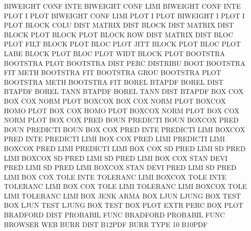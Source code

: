 BIWEIGHT CONF INTE                      BIWEIGHT CONF LIMI
BIWEIGHT CONF INTE PLOT                 I        PLOT
BIWEIGHT CONF LIMI PLOT                 I        PLOT
BIWEIGHT I    PLOT                      I        PLOT
BLOCK    COLU DIST                      MATRIX   DIST
BLOCK    DIST                           MATRIX   DIST
BLOCK    PLOT                           BLOCK    PLOT
BLOCK    ROW  DIST                      MATRIX   DIST
BLOC     PLOT FILT                      BLOCK    PLOT
BLOC     PLOT JITT                      BLOCK    PLOT
BLOC     PLOT LABE                      BLOCK    PLOT
BLOC     PLOT WIDT                      BLOCK    PLOT
BOOTSTRA                                BOOTSTRA PLOT
BOOTSTRA DIST PERC                      DISTRIBU BOOT
BOOTSTRA FIT  METH                      BOOTSTRA FIT
BOOTSTRA GROU                           BOOTSTRA PLOT
BOOTSTRA METH                           BOOTSTRA FIT
BOREL                                   BTAPDF
BOREL    DIST                           BTAPDF
BOREL    TANN                           BTAPDF
BOREL    TANN DIST                      BTAPDF
BOX      COX                            BOX      COX  NORM PLOT
BOXCOX                                  BOX      COX  NORM PLOT
BOXCOX   HOMO PLOT                      BOX      COX  HOMO PLOT
BOXCOX   NORM PLOT                      BOX      COX  NORM PLOT
BOX      COX  PRED BOUN                 PREDICTI BOUN
BOXCOX   PRED BOUN                      PREDICTI BOUN
BOX      COX  PRED INTE                 PREDICTI LIMI
BOXCOX   PRED INTE                      PREDICTI LIMI
BOX      COX  PRED LIMI                 PREDICTI LIMI
BOXCOX   PRED LIMI                      PREDICTI LIMI
BOX      COX  SD   PRED LIMI            SD       PRED LIMI
BOXCOX   SD   PRED LIMI                 SD       PRED LIMI
BOX      COX  STAN DEVI PRED LIMI       SD       PRED LIMI
BOXCOX   STAN DEVI PRED LIMI            SD       PRED LIMI
BOX      COX  TOLE INTE                 TOLERANC LIMI
BOXCOX   TOLE INTE                      TOLERANC LIMI
BOX      COX  TOLE LIMI                 TOLERANC LIMI
BOXCOX   TOLE LIMI                      TOLERANC LIMI
BOX      JENK                           ARMA
BOX      LJUN                           LJUNG    BOX  TEST
BOX      LJUN TEST                      LJUNG    BOX  TEST
BOX      PLOT EXTR PERC                 BOX      PLOT
BRADFORD DIST                           PROBABIL FUNC
BRADFORD                                PROBABIL FUNC
BROWSER                                 WEB
BURR     DIST                           B12PDF
BURR     TYPE 10                        B10PDF
